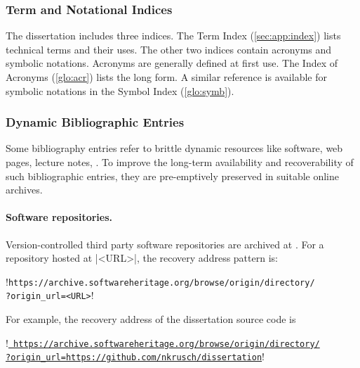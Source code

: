 \subsubsection{Term and Notational Indices}

The dissertation includes three indices. The Term Index
(\autoref{sec:app:index}) lists technical terms and their uses. The other two
indices contain acronyms and symbolic notations. Acronyms are generally defined
at first use. The Index of Acronyms (\autoref{glo:acr}) lists the long form. A
similar reference is available for symbolic notations in the Symbol Index
(\autoref{glo:symb}).

\subsubsection{Dynamic Bibliographic Entries}
\label{sssec:dyn-bib}

Some bibliography entries refer to brittle dynamic resources like software, web
pages, lecture notes, \etc. To improve the long-term availability and
recoverability of such bibliographic entries, they are pre-emptively preserved
in suitable online archives.

\paragraph*{Software repositories.}
Version-controlled third party software repositories are archived at
\href{https://softwareheritage.org}{}. For a repository
hosted at \pr|<URL>|, the recovery address pattern is:

\begin{center}
\begin{minipage}{\textwidth}
\begin{browserlisting}
!\texttt{https://archive.softwareheritage.org/browse/origin/directory/}\\
\mbox{\texttt{?origin\_url=<URL>}}!
\end{browserlisting}
\end{minipage}
\end{center}

For example, the recovery address of the dissertation source code is

\begin{center}
\begin{minipage}{\textwidth}
\begin{browserlisting}
!\texttt{\href{https://archive.softwareheritage.org/browse/origin/directory/?origin_url=https://github.com/nkrusch/dissertation}{
https://archive.softwareheritage.org/browse/origin/directory/\\?origin\_url=https://github.com/nkrusch/dissertation}}!
\end{browserlisting}
\end{minipage}
\end{center}

